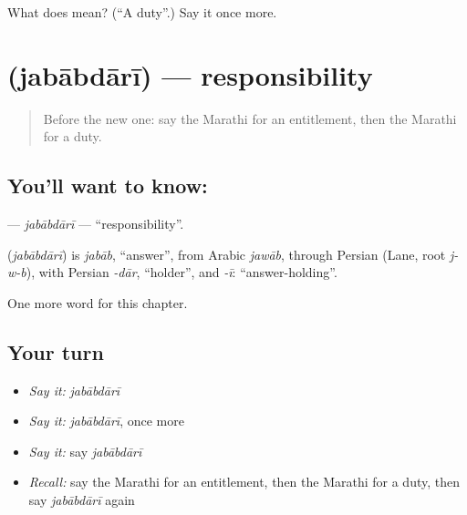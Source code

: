 \begin{tcolorbox}[breakable,colback=teal!4,colframe=teal!35!black,title={Before you move on}]
What does  mean? (\textquotedblleft{}A duty\textquotedblright{}.) Say it once more.
\end{tcolorbox}
\section[\texorpdfstring{\mr{जबाबदारी} (jabābdārī)}{जबाबदारी (jabābdārī)}]{ (jabābdārī) — responsibility}

\label{lesson:MR-C272-jababdari}



\begin{quote}
Before the new one: say the Marathi for an entitlement, then the Marathi for a duty.
\end{quote}

\subsection*{You'll want to know: }
\textbf{} — \emph{jabābdārī} — \textquotedblleft{}responsibility\textquotedblright{}.

\begin{cousinweb}
\textbf{} (\emph{jabābdārī}) is \emph{jabāb}, \textquotedblleft{}answer\textquotedblright{}, from Arabic \emph{jawāb}, through Persian (Lane, root \emph{j-w-b}), with Persian \emph{-dār}, \textquotedblleft{}holder\textquotedblright{}, and \emph{-ī}: \textquotedblleft{}answer-holding\textquotedblright{}.
\end{cousinweb}

\begin{grammarlens}[title={What you've built}]
One more word for this chapter.
\end{grammarlens}

\subsection*{Your turn}
\begin{itemize}
\raggedright
  \item \emph{Say it:} \emph{jabābdārī}
  \item \emph{Say it:} \emph{jabābdārī}, once more
  \item \emph{Say it:} say \emph{jabābdārī}
  \item \emph{Recall:} say the Marathi for an entitlement, then the Marathi for a duty, then say \emph{jabābdārī} again
\end{itemize}

